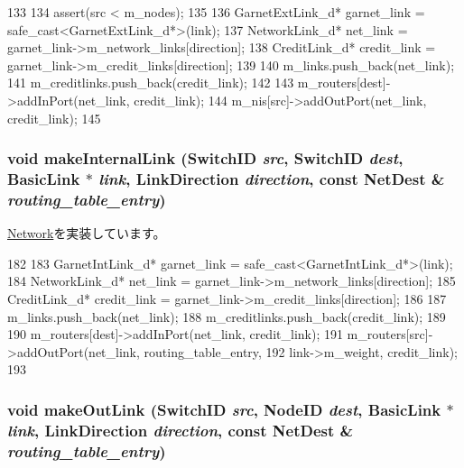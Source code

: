 \begin{DoxyCode}
133 {
134     assert(src < m_nodes);
135 
136     GarnetExtLink_d* garnet_link = safe_cast<GarnetExtLink_d*>(link);
137     NetworkLink_d* net_link = garnet_link->m_network_links[direction];
138     CreditLink_d* credit_link = garnet_link->m_credit_links[direction];
139 
140     m_links.push_back(net_link);
141     m_creditlinks.push_back(credit_link);
142 
143     m_routers[dest]->addInPort(net_link, credit_link);
144     m_nis[src]->addOutPort(net_link, credit_link);
145 }
\end{DoxyCode}
\hypertarget{classGarnetNetwork__d_a035f37231d3a7edcadd92b7d9e17d4e4}{
\subsubsection[{makeInternalLink}]{\setlength{\rightskip}{0pt plus 5cm}void makeInternalLink ({\bf SwitchID} {\em src}, \/  {\bf SwitchID} {\em dest}, \/  {\bf BasicLink} $\ast$ {\em link}, \/  LinkDirection {\em direction}, \/  const {\bf NetDest} \& {\em routing\_\-table\_\-entry})}}
\label{classGarnetNetwork__d_a035f37231d3a7edcadd92b7d9e17d4e4}


\hyperlink{classNetwork_adc0a708d423af0acbe045a50a46d7b03}{Network}を実装しています。


\begin{DoxyCode}
182 {
183     GarnetIntLink_d* garnet_link = safe_cast<GarnetIntLink_d*>(link);
184     NetworkLink_d* net_link = garnet_link->m_network_links[direction];
185     CreditLink_d* credit_link = garnet_link->m_credit_links[direction];
186 
187     m_links.push_back(net_link);
188     m_creditlinks.push_back(credit_link);
189 
190     m_routers[dest]->addInPort(net_link, credit_link);
191     m_routers[src]->addOutPort(net_link, routing_table_entry,
192                                          link->m_weight, credit_link);
193 }
\end{DoxyCode}
\hypertarget{classGarnetNetwork__d_a87915d87a2b4c11ae5f0f4da31bd2375}{
\subsubsection[{makeOutLink}]{\setlength{\rightskip}{0pt plus 5cm}void makeOutLink ({\bf SwitchID} {\em src}, \/  {\bf NodeID} {\em dest}, \/  {\bf BasicLink} $\ast$ {\em link}, \/  LinkDirection {\em direction}, \/  const {\bf NetDest} \& {\em routing\_\-table\_\-entry})}}
\label{classGarnetNetwork__d_a87915d87a2b4c11ae5f0f4da31bd2375}


